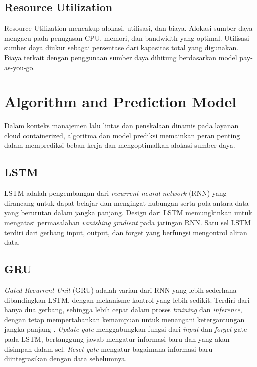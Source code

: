 \subsection{Resource Utilization}

Resource Utilization mencakup alokasi, utilisasi, dan biaya. Alokasi sumber daya mengacu pada penugasan CPU, memori, dan bandwidth yang optimal. Utilisasi sumber daya diukur sebagai persentase dari kapasitas total yang digunakan. Biaya terkait dengan penggunaan sumber daya dihitung berdasarkan model pay-as-you-go.

\section{Algorithm and Prediction Model}
\label{sec:algorithm-prediction}

Dalam konteks manajemen lalu lintas dan penskalaan dinamis pada layanan cloud containerized, algoritma dan model prediksi memainkan peran penting dalam memprediksi beban kerja dan mengoptimalkan alokasi sumber daya.

\subsection{LSTM}

LSTM adalah pengembangan dari \emph{recurrent neural network} (RNN) yang dirancang untuk dapat belajar dan mengingat hubungan serta pola antara data yang berurutan dalam jangka panjang. Design dari LSTM memungkinkan untuk mengatasi permasalahan \emph{vanishing gradient} pada jaringan RNN. Satu sel LSTM terdiri dari gerbang input, output, dan forget yang berfungsi mengontrol aliran data.

\subsection{GRU}

\emph{Gated Recurrent Unit} (GRU) adalah varian dari RNN yang lebih sederhana dibandingkan LSTM, dengan mekanisme kontrol yang lebih sedikit. Terdiri dari hanya dua gerbang, sehingga lebih cepat dalam proses \emph{training} dan \emph{inference}, dengan tetap mempertahankan kemampuan untuk menangani ketergantungan jangka panjang \citep{mondal2023gru}. \emph{Update gate} menggabungkan fungsi dari \emph{input} dan \emph{forget} gate pada LSTM, bertanggung jawab mengatur informasi baru dan yang akan disimpan dalam sel. \emph{Reset gate} mengatur bagaimana informasi baru diintegrasikan dengan data sebelumnya.

